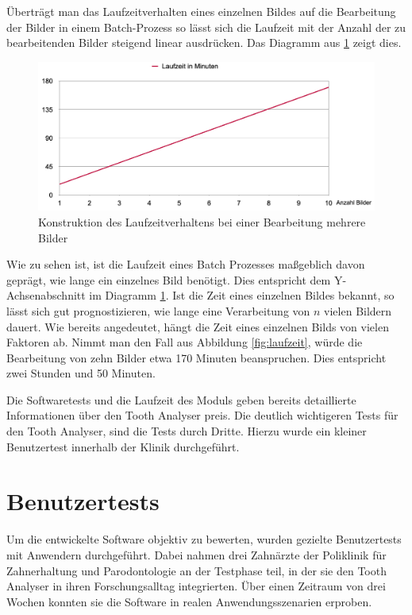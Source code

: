 Überträgt man das Laufzeitverhalten eines einzelnen Bildes auf die Bearbeitung der
Bilder in einem Batch-Prozess so lässt sich die Laufzeit mit der Anzahl der zu bearbeitenden
Bilder steigend linear ausdrücken. Das Diagramm aus \ref{fig:laufzeit_batch}
zeigt dies.

\begin{figure}[h]
	\centering
	\includegraphics[width=1\textwidth]{img/runtimeBatch.png}
	\caption{Konstruktion des Laufzeitverhaltens bei einer Bearbeitung mehrere
	Bilder}
	\label{fig:laufzeit_batch}
\end{figure}

Wie zu sehen ist, ist die Laufzeit eines Batch Prozesses maßgeblich davon
geprägt, wie lange ein einzelnes Bild benötigt. Dies entspricht dem Y-Achsenabschnitt
im Diagramm \ref{fig:laufzeit_batch}. Ist die Zeit eines einzelnen Bildes bekannt,
so lässt sich gut prognostizieren, wie lange eine Verarbeitung von $n$ vielen Bildern
dauert. Wie bereits angedeutet, hängt die Zeit eines einzelnen Bilds von vielen Faktoren
ab. Nimmt man den Fall aus Abbildung \ref{fig:laufzeit}, würde die Bearbeitung von
zehn Bilder etwa 170 Minuten beanspruchen. Dies entspricht zwei Stunden und 50
Minuten.

Die Softwaretests und die Laufzeit des Moduls geben bereits detaillierte
Informationen über den Tooth Analyser preis. Die deutlich wichtigeren Tests für den
Tooth Analyser, sind die Tests durch Dritte. Hierzu wurde ein kleiner Benutzertest
innerhalb der Klinik durchgeführt.

\section{Benutzertests}
\label{sec:benutzertests}Um die entwickelte Software objektiv zu bewerten, wurden
gezielte Benutzertests mit Anwendern durchgeführt. Dabei nahmen drei Zahnärzte
der Poliklinik für Zahnerhaltung und Parodontologie an der Testphase teil, in der
sie den Tooth Analyser in ihren Forschungsalltag integrierten. Über einen
Zeitraum von drei Wochen konnten sie die Software in realen Anwendungsszenarien
erproben.

